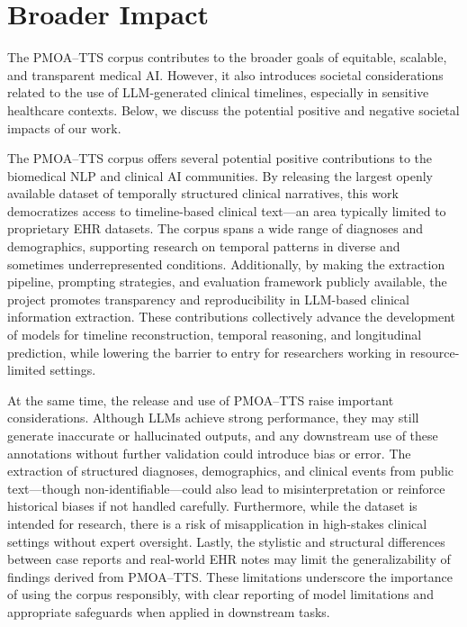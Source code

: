 
\section{Broader Impact}
\label{apd:broader_impact}

The PMOA–TTS corpus contributes to the broader goals of equitable, scalable, and transparent medical AI. However, it also introduces societal considerations related to the use of LLM-generated clinical timelines, especially in sensitive healthcare contexts. Below, we discuss the potential positive and negative societal impacts of our work. 

The PMOA–TTS corpus offers several potential positive contributions to the biomedical NLP and clinical AI communities. By releasing the largest openly available dataset of temporally structured clinical narratives, this work democratizes access to timeline-based clinical text—an area typically limited to proprietary EHR datasets. The corpus spans a wide range of diagnoses and demographics, supporting research on temporal patterns in diverse and sometimes underrepresented conditions. Additionally, by making the extraction pipeline, prompting strategies, and evaluation framework publicly available, the project promotes transparency and reproducibility in LLM-based clinical information extraction. These contributions collectively advance the development of models for timeline reconstruction, temporal reasoning, and longitudinal prediction, while lowering the barrier to entry for researchers working in resource-limited settings.

At the same time, the release and use of PMOA–TTS raise important considerations. Although LLMs achieve strong performance, they may still generate inaccurate or hallucinated outputs, and any downstream use of these annotations without further validation could introduce bias or error. The extraction of structured diagnoses, demographics, and clinical events from public text—though non-identifiable—could also lead to misinterpretation or reinforce historical biases if not handled carefully. Furthermore, while the dataset is intended for research, there is a risk of misapplication in high-stakes clinical settings without expert oversight. Lastly, the stylistic and structural differences between case reports and real-world EHR notes may limit the generalizability of findings derived from PMOA–TTS. These limitations underscore the importance of using the corpus responsibly, with clear reporting of model limitations and appropriate safeguards when applied in downstream tasks.

